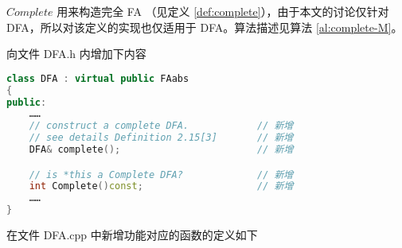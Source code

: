$Complete$ 用来构造完全 FA （见定义 \ref{def:complete}），由于本文的讨论仅针对 DFA，所以对该定义的实现也仅适用于 DFA。算法描述见算法 \ref{al:complete-M}。

向文件 DFA.h 内增加下内容

\begin{lstlisting}[language=C++,label={lst:complete-def},caption={文件 DFA.h}]
class DFA : virtual public FAabs
{
public:
    ……
    // construct a complete DFA.            // 新增
    // see details Definition 2.15[3]       // 新增
    DFA& complete();                        // 新增

    // is *this a Complete DFA?             // 新增
    int Complete()const;                    // 新增
    ……
}
\end{lstlisting}
    
在文件 DFA.cpp 中新增功能对应的函数的定义如下
    
